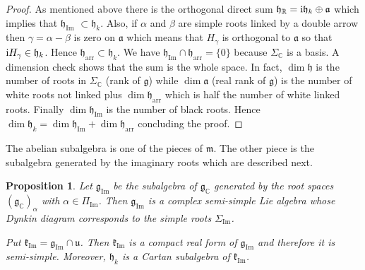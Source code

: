 \documentclass[pdftex]{sigma}
\numberwithin{equation}{section}
\newtheorem{Proposition}[Theorem]{Proposition}
 { \theoremstyle{definition}
\newtheorem{Definition}[Theorem]{Definition}
\newtheorem{Note}[Theorem]{Note}
\newtheorem{Example}[Theorem]{Example}
\newtheorem{Remark}[Theorem]{Remark} }
\newcommand{\func}[1]{\operatorname{#1}}
\begin{document}
\begin{proof}As mentioned above there is the orthogonal direct sum $\mathfrak{h}_{\mathbb{R}}={\rm i}\mathfrak{h}_{k}\oplus \mathfrak{a}$ which implies that $\mathfrak{h}_{\func{Im}}$ $\subset \mathfrak{h}_{k}$. Also, if $\alpha $ and $\beta $ are simple roots linked by a double arrow then $\gamma =\alpha -\beta $ is zero on $\mathfrak{a}$ which means that $H_{\gamma }$ is orthogonal to $\mathfrak{a}$ so that ${\rm i}H_{\gamma }\in \mathfrak{h}_{k}$. Hence $\mathfrak{h}_{\mathrm{arr}}\subset \mathfrak{h}_{k}$. We have $\mathfrak{h}_{\func{Im}}\cap \mathfrak{h}_{\mathrm{arr}}=\{0\}$ because $\Sigma _{\mathbb{C}}$ is a basis. A dimension check shows that the sum is the whole space. In fact, $\dim \mathfrak{h}$ is the number of roots in $\Sigma _{\mathbb{C}}$ (rank of $\mathfrak{g}$) while $\dim \mathfrak{a}$ (real rank of $\mathfrak{g}$) is the number of white roots not linked plus $\dim \mathfrak{h}_{\mathrm{arr}}$ which is half the number of white linked roots. Finally $\dim \mathfrak{h}_{\func{Im}}$ is the number of black roots. Hence $\dim \mathfrak{h}_{k}=\dim \mathfrak{h}_{\func{Im}}+\dim \mathfrak{h}_{\mathrm{arr}}$ concluding the proof.
\end{proof}

The abelian subalgebra is one of the pieces of $\mathfrak{m}$. The other piece is the subalgebra generated by the imaginary roots which are described next.

\begin{Proposition}Let $\mathfrak{g}_{\func{Im}}$ be the subalgebra of $\mathfrak{g}_{\mathbb{C}}$ generated by the root spaces $( \mathfrak{g}_{\mathbb{C}})_{\alpha }$ with \mbox{$\alpha \in \Pi _{\func{Im}}$}. Then $\mathfrak{g}_{\func{Im}}$ is a complex semi-simple Lie algebra whose Dynkin diagram corresponds to the simple roots $\Sigma _{\func{Im}}$.

Put $\mathfrak{k}_{\func{Im}}=\mathfrak{g}_{\func{Im}}\cap \mathfrak{u}$. Then $\mathfrak{k}_{\func{Im}}$ is a compact real form of $\mathfrak{g}_{\func{Im}}$ and therefore it is semi-simple. Moreover, $\mathfrak{h}_{k}$ is a Cartan subalgebra of $\mathfrak{k}_{\func{Im}}$.
\end{Proposition}
\end{document}
